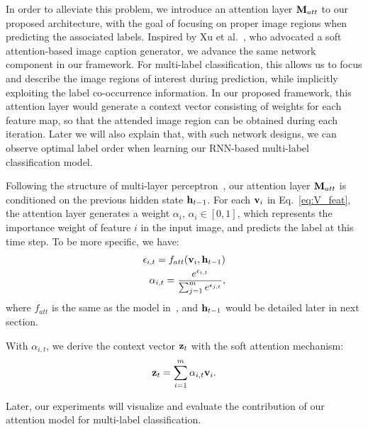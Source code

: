 \documentclass[letterpaper]{article} %
\begin{document}
In order to alleviate this problem, we introduce an attention layer $\mathbf{M}_{att}$ to our proposed architecture, with the goal of focusing on proper image regions when predicting the associated labels. Inspired by Xu et al.~\cite{xu2015show}, who advocated a soft attention-based image caption generator, we advance the same network component in our framework. For multi-label classification, this allows us to focus and describe the image regions of interest during prediction, while implicitly exploiting the label co-occurrence information. In our proposed framework, this attention layer would generate a context vector consisting of weights for each feature map, so that the attended image region can be obtained during each iteration. Later we will also explain that, with such network designs, we can observe optimal label order when learning our RNN-based multi-label classification model.


Following the structure of multi-layer perceptron~\cite{xu2015show}, our attention layer $\mathbf{M}_{att}$ is conditioned on the previous hidden state $\mathbf{h}_{t-1}$. For each $\mathbf{v}_i$ in Eq.~\ref{eq:V_feat}, the attention layer generates a weight $\alpha_i$, $\alpha_i \in [0, 1]$, which represents the importance weight of feature $i$ in the input image, and predicts the label at this time step. To be more specific, we have:
\begin{equation}
\label{eq:atten_weight}
\begin{aligned}
\epsilon_{i,t} = f_{att}(\mathbf{v}_i, \mathbf{h}_{t-1}) \\
\alpha_{i,t} = \frac{e^{\epsilon_{i,t}} }{ \sum_{j=1}^m e^{\epsilon_{j,t}}},
\end{aligned}
\end{equation}
where $f_{att}$ is the same as the model in~\cite{xu2015show}, and $\mathbf{h}_{t-1}$ would be detailed later in next section.

With $\alpha_{i,t}$, we derive the context vector $\mathbf{z}_t$ with the soft attention mechanism:
\begin{equation}
\label{eq:context}
\begin{aligned}
\mathbf{z}_t = \sum_{i=1}^m \alpha_{i,t}\mathbf{v}_i.
\end{aligned}
\end{equation}

Later, our experiments will visualize and evaluate the contribution of our attention model for multi-label classification.\\
\end{document}
